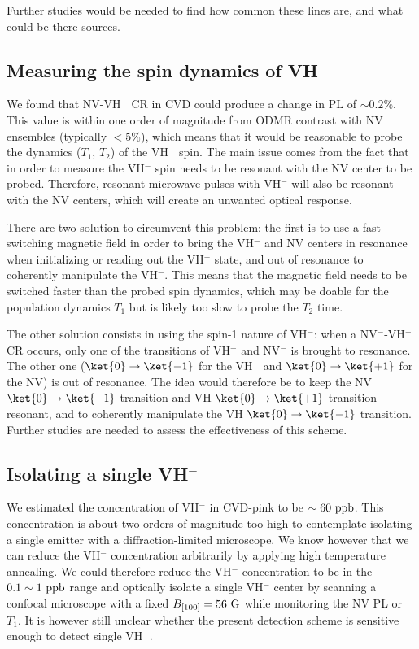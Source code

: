 \documentclass[a4paper, 11pt]{report}
\begin{document}
Further studies would be needed to find how common these lines are, and what could be there sources.

\subsection{Measuring the spin dynamics of VH$^-$}

We found that NV-VH$^-$ CR in CVD could produce a change in PL of $\sim 0.2 \%$. This value is within one order of magnitude from ODMR contrast with NV ensembles (typically $<5 \%$), which means that it would be reasonable to probe the dynamics ($T_1$, $T_2$) of the VH$^-$ spin. The main issue comes from the fact that in order to measure the VH$^-$ spin needs to be resonant with the NV center to be probed. Therefore, resonant microwave pulses with VH$^-$ will also be resonant with the NV centers, which will create an unwanted optical response.

There are two solution to circumvent this problem: the first is to use a fast switching magnetic field in order to bring the VH$^-$ and NV centers in resonance when initializing or reading out the VH$^-$ state, and out of resonance to coherently manipulate the VH$^-$. This means that the magnetic field needs to be switched faster than the probed spin dynamics, which may be doable for the population dynamics $T_1$ but is likely too slow to probe the $T_2$ time.

The other solution consists in using the spin-1 nature of VH$^-$: when a NV$^-$-VH$^-$ CR occurs, only one of the transitions of VH$^-$ and NV$^-$ is brought to resonance. The other one ($\ket{0} \to \ket{-1}$ for the VH$^-$ and $\ket{0} \to \ket{+1}$ for the NV) is out of resonance. The idea would therefore be to keep the NV $\ket{0} \to \ket{-1}$ transition and VH $\ket{0} \to \ket{+1}$ transition resonant, and to coherently manipulate the VH $\ket{0} \to \ket{-1}$ transition. Further studies are needed to assess the effectiveness of this scheme.

\subsection{Isolating a single VH$^-$}

We estimated the concentration of VH$^-$ in CVD-pink to be $\sim 60\ \rm ppb$. This concentration is about two orders of magnitude too high to contemplate isolating a single emitter with a diffraction-limited microscope. We know however that we can reduce the VH$^-$ concentration arbitrarily by applying high temperature annealing. We could therefore reduce the VH$^-$ concentration to be in the $0.1 \sim 1\ \rm ppb$ range and optically isolate a single VH$^-$ center by scanning a confocal microscope with a fixed $B_{[100]}=56\ \rm G$ while monitoring the NV PL or $T_1$. It is however still unclear whether the present detection scheme is sensitive enough to detect single VH$^-$.
\end{document}
